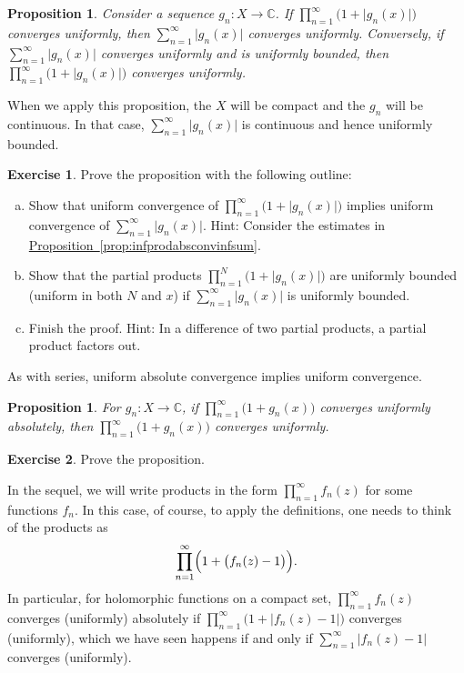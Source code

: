 \documentclass[12pt,openany]{book}
\newcommand{\sabs}[1]{\lvert {#1} \rvert}
\newcommand{\C}{{\mathbb{C}}}
\theoremstyle{plain}
\newtheorem{prop}[thm]{Proposition}
\theoremstyle{remark}
\theoremstyle{definition}
\newenvironment{exbox}{%
    \def\FrameCommand{\vrule width 1pt \relax\hspace{10pt}}%
    \MakeFramed{\advance\hsize-\width\FrameRestore}%
}{%
    \endMakeFramed
}
\newenvironment{exparts}{%
    \leavevmode\begin{enumerate}[a),noitemsep,topsep=0pt,parsep=0pt,partopsep=0pt]
}{%
    \end{enumerate}
}
\theoremstyle{exercise}
\newtheorem{exercise}{Exercise}[section]
\theoremstyle{example}
\newcommand{\propref}[1]{\hyperref[#1]{Proposition~\ref*{#1}}}
\begin{document}
\begin{prop}
Consider a sequence $g_n \colon X \to \C$.
If
$\prod_{n=1}^{\infty} \bigl(1+\sabs{g_n(x)}\bigr)$ 
converges uniformly, then
$\sum_{n=1}^{\infty} \sabs{g_n(x)}$ converges uniformly.
Conversely, if
$\sum_{n=1}^{\infty} \sabs{g_n(x)}$ converges uniformly
and is uniformly bounded, then
$\prod_{n=1}^{\infty} \bigl(1+\sabs{g_n(x)}\bigr)$ 
converges uniformly.
\end{prop}

When we apply this proposition, the $X$ will be compact
and the $g_n$ will be continuous.
In that case, 
$\sum_{n=1}^{\infty} \sabs{g_n(x)}$ is continuous and hence
uniformly bounded.

\begin{exbox}
\begin{exercise}
Prove the proposition with the following outline:
\begin{exparts}
\item Show that uniform convergence of
$\prod_{n=1}^{\infty} \bigl(1+\sabs{g_n(x)}\bigr)$
implies
uniform convergence of
$\sum_{n=1}^{\infty} \sabs{g_n(x)}$.
Hint:
Consider the estimates in \propref{prop:infprodabsconvinfsum}.
\item Show that
the partial products 
$\prod_{n=1}^{N} \bigl(1+\sabs{g_n(x)}\bigr)$
are uniformly bounded (uniform in both $N$ and $x$)
if $\sum_{n=1}^{\infty} \sabs{g_n(x)}$ is uniformly bounded.
\item Finish the proof.  Hint: In a difference of 
two partial products, a partial product factors out.
\end{exparts}
\end{exercise}
\end{exbox}

As with series, uniform absolute convergence implies uniform
convergence.

\begin{prop} \label{prop:unifabsconvprod}
For $g_n \colon X \to \C$, if
$\prod_{n=1}^{\infty} \bigl(1+g_n(x)\bigr)$ 
converges uniformly absolutely, then
$\prod_{n=1}^{\infty} \bigl(1+g_n(x)\bigr)$ 
converges uniformly.
\end{prop}

\begin{exbox}
\begin{exercise}
Prove the proposition.
\end{exercise}
\end{exbox}

In the sequel,
we will write products in the form $\prod_{n=1}^\infty f_n(z)$
for some functions $f_n$.
In this case, of course, to apply the definitions, one needs to think of
the products as
\begin{equation*}
\prod_{n=1}^\infty \Bigl( 1 + \bigl(f_n(z)-1\bigr) \Bigr).
\end{equation*}
In particular, for holomorphic functions on a compact set,
$\prod_{n=1}^\infty f_n(z)$ converges (uniformly) absolutely 
if 
$\prod_{n=1}^\infty \bigl( 1 + \sabs{f_n(z)-1} \bigr)$
converges (uniformly),
which we have seen happens if and only if
$\sum_{n=1}^\infty \sabs{f_n(z)-1}$ converges (uniformly).
\end{document}
